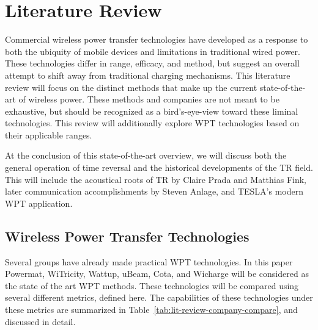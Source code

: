\chapter{Literature Review}
\label{ch:lit-review}

Commercial wireless power transfer technologies have developed as a response to both the ubiquity of mobile devices and limitations in traditional wired power. These technologies differ in range, efficacy, and method, but suggest an overall attempt to shift away from traditional charging mechanisms. This literature review will focus on the distinct methods that make up the current state-of-the-art of wireless power. These methods and companies are not meant to be exhaustive, but should be recognized as a bird’s-eye-view toward these liminal technologies. This review will additionally explore WPT technologies based on their applicable ranges.

At the conclusion of this state-of-the-art overview, we will discuss both the general operation of time reversal and the historical developments of the TR field. This will include the acoustical roots of TR by Claire Prada and Matthias Fink, later communication accomplishments by Steven Anlage, and TESLA’s modern WPT application. 

\section{Wireless Power Transfer Technologies}

Several groups have already made practical WPT technologies. In this paper Powermat, WiTricity, Wattup, uBeam, Cota, and Wicharge will be considered as the state of the art WPT methods. These technologies will be compared using several different metrics, defined here. The capabilities of these technologies under these metrics are summarized in Table~\ref{tab:lit-review-company-compare}, and discussed in detail. 

